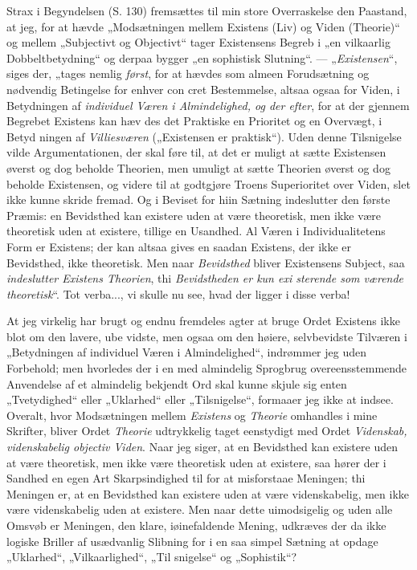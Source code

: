\documentclass[12pt]{book}
\newcommand{\opage}[1]{\marginnote{\footnotesize\textit{[#1]}}}
\begin{document}
Strax i Begyndelsen (S. 130) fremsættes til min
store Overraskelse den Paastand, at jeg, for at hævde
„Modsætningen mellem Existens (Liv) og Viden (Theorie)“
og mellem „Subjectivt og Objectivt“ tager Existensens
Begreb i „en vilkaarlig Dobbeltbetydning“ og derpaa
bygger „en sophistisk Slutning“. --- „\emph{Existensen}“, siges
der, „tages nemlig \emph{først}, for at hævdes som almeen
Forudsætning og nødvendig Betingelse for enhver con\-%
cret Bestemmelse, altsaa ogsaa for Viden, i Betydningen
af \emph{individuel Væren i Almindelighed, og der\-%
efter}, for at der gjennem Begrebet Existens kan hæv\-%
des det Praktiske en Prioritet og en Overvægt, i Betyd\-%
ningen af \emph{Villiesværen} („Existensen er praktisk“).
Uden denne Tilsnigelse vilde Argumentationen, der skal
føre til, at det er muligt at sætte Existensen øverst og dog
beholde Theorien, men umuligt at sætte Theorien øverst
\opage{9}\setcounter{footnote}{0}%
og dog beholde Existensen, og videre til at godtgjøre
Troens Superioritet over Viden, slet ikke kunne skride
fremad. Og i Beviset for hiin Sætning indeslutter den
første Præmis: en Bevidsthed kan existere uden at være
theoretisk, men ikke være theoretisk uden at existere,
tillige en Usandhed. Al Væren i Individualitetens Form %
er Existens; der kan altsaa gives en saadan Existens,
der ikke er Bevidsthed, ikke theoretisk. Men naar
\emph{Bevidsthed} bliver Existensens Subject, saa \emph{indeslutter
Existens Theorien}, thi \emph{Bevidstheden er kun exi\-%
sterende som værende theoretisk}“. Tot verba...,
vi skulle nu see, hvad der ligger i disse verba!

At jeg virkelig har brugt og endnu fremdeles agter
at bruge Ordet Existens ikke blot om den lavere, ube\-%
vidste, men ogsaa om den høiere, selvbevidste Tilværen
i „Betydningen af individuel Væren i Almindelighed“,
indrømmer jeg uden Forbehold; men hvorledes der i en
med almindelig Sprogbrug overeensstemmende Anvendelse
af et almindelig bekjendt Ord skal kunne skjule sig enten
„Tvetydighed“ eller „Uklarhed“ eller „Tilsnigelse“,
formaaer jeg ikke at indsee. Overalt, hvor Modsætningen
mellem \emph{Existens} og \emph{Theorie} omhandles i mine Skrifter,
bliver Ordet \emph{Theorie} udtrykkelig taget eenstydigt med
Ordet \emph{Videnskab, videnskabelig objectiv Viden}.
Naar jeg siger, at en Bevidsthed kan existere uden at
være theoretisk, men ikke være theoretisk uden at existere,
saa hører der i Sandhed en egen Art Skarpsindighed til
for at misforstaae Meningen; thi Meningen er, at en
Bevidsthed kan existere uden at være videnskabelig, men
ikke være videnskabelig uden at existere. Men naar
dette uimodsigelig og uden alle Omsvøb er Meningen,
den klare, iøinefaldende Mening, udkræves der da ikke
logiske Briller af usædvanlig Slibning for i en saa simpel
\opage{10}\setcounter{footnote}{0}%
Sætning at opdage „Uklarhed“, „Vilkaarlighed“, „Til\-%
snigelse“ og „Sophistik“?
\end{document}
